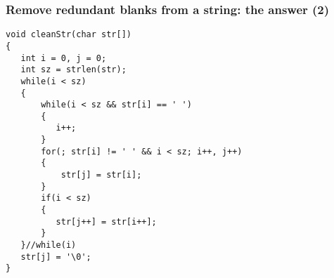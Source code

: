 \ifx\answer\undefined
\begin{frame}[fragile]
\frametitle{Remove redundant blanks from a string: the answer (2)}
\vspace{-0.15in}
\begin{lstlisting}
void cleanStr(char str[])
{
   int i = 0, j = 0;
   int sz = strlen(str);
   while(i < sz)
   {
       while(i < sz && str[i] == ' ')
       {
          i++; 
       }
       for(; str[i] != ' ' && i < sz; i++, j++)
       {
           str[j] = str[i];
       }
       if(i < sz)
       {
          str[j++] = str[i++];
       }
   }//while(i)
   str[j] = '\0';
}
\end{lstlisting}
\end{frame}
\fi
